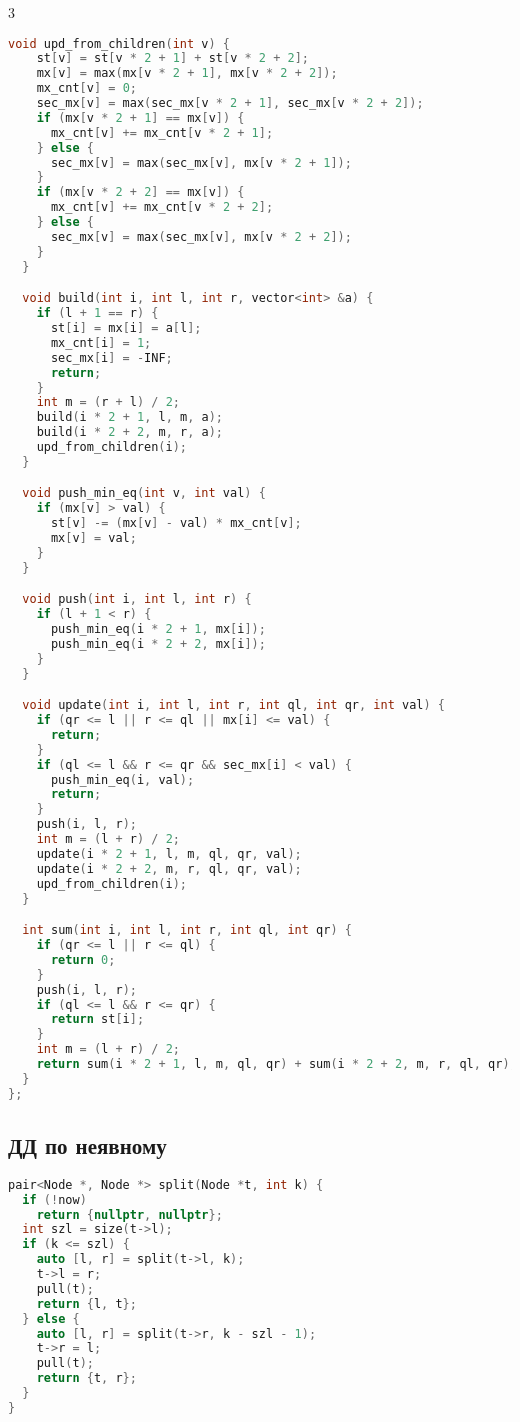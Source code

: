 \documentclass[9pt,a4paper,landscape,twosided]{extarticle}
\begin{document}
\begin{multicols*}{3}
\begin{lstlisting}[language=C++]
  void upd_from_children(int v) {
    st[v] = st[v * 2 + 1] + st[v * 2 + 2];
    mx[v] = max(mx[v * 2 + 1], mx[v * 2 + 2]);
    mx_cnt[v] = 0;
    sec_mx[v] = max(sec_mx[v * 2 + 1], sec_mx[v * 2 + 2]);
    if (mx[v * 2 + 1] == mx[v]) {
      mx_cnt[v] += mx_cnt[v * 2 + 1];
    } else {
      sec_mx[v] = max(sec_mx[v], mx[v * 2 + 1]);
    }
    if (mx[v * 2 + 2] == mx[v]) {
      mx_cnt[v] += mx_cnt[v * 2 + 2];
    } else {
      sec_mx[v] = max(sec_mx[v], mx[v * 2 + 2]);
    }
  }

  void build(int i, int l, int r, vector<int> &a) {
    if (l + 1 == r) {
      st[i] = mx[i] = a[l];
      mx_cnt[i] = 1;
      sec_mx[i] = -INF;
      return;
    }
    int m = (r + l) / 2;
    build(i * 2 + 1, l, m, a);
    build(i * 2 + 2, m, r, a);
    upd_from_children(i);
  }

  void push_min_eq(int v, int val) {
    if (mx[v] > val) {
      st[v] -= (mx[v] - val) * mx_cnt[v];
      mx[v] = val;
    }
  }

  void push(int i, int l, int r) {
    if (l + 1 < r) {
      push_min_eq(i * 2 + 1, mx[i]);
      push_min_eq(i * 2 + 2, mx[i]);
    }
  }

  void update(int i, int l, int r, int ql, int qr, int val) {
    if (qr <= l || r <= ql || mx[i] <= val) {
      return;
    }
    if (ql <= l && r <= qr && sec_mx[i] < val) {
      push_min_eq(i, val);
      return;
    }
    push(i, l, r);
    int m = (l + r) / 2;
    update(i * 2 + 1, l, m, ql, qr, val);
    update(i * 2 + 2, m, r, ql, qr, val);
    upd_from_children(i);
  }

  int sum(int i, int l, int r, int ql, int qr) {
    if (qr <= l || r <= ql) {
      return 0;
    }
    push(i, l, r);
    if (ql <= l && r <= qr) {
      return st[i];
    }
    int m = (l + r) / 2;
    return sum(i * 2 + 1, l, m, ql, qr) + sum(i * 2 + 2, m, r, ql, qr);
  }
};
\end{lstlisting}

\subsection{ДД по неявному}
\begin{lstlisting}[language=C++]
pair<Node *, Node *> split(Node *t, int k) {
  if (!now)
    return {nullptr, nullptr};
  int szl = size(t->l);
  if (k <= szl) {
    auto [l, r] = split(t->l, k);
    t->l = r;
    pull(t);
    return {l, t};
  } else {
    auto [l, r] = split(t->r, k - szl - 1);
    t->r = l;
    pull(t);
    return {t, r};
  }
}


\end{lstlisting}
\end{multicols*}
\end{document}
